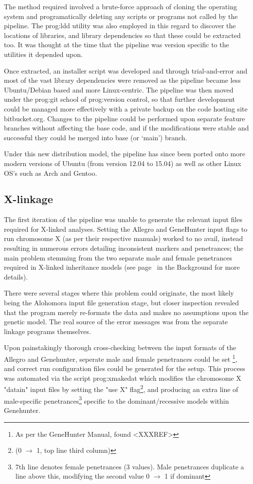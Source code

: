 The method required involved a brute-force approach of cloning the operating system and programatically deleting any scripts or programs not called by the pipeline. The \gls{prog:ldd} utility was also employed in this regard to discover the locations of libraries, and library dependencies so that these could be extracted too. It was thought at the time that the pipeline was version specific to the utilities it depended upon.

Once extracted, an installer script was developed and through trial-and-error and most of the vast library dependencies were removed as the pipeline became less Ubuntu/Debian based and more Linux-centric. The pipeline was then moved under the \gls{prog:git} school of \gls{prog:version control}, so that further development could be managed more effectively with a private backup on the code hosting site bitbucket.org. Changes to the pipeline could be performed upon separate feature branches without affecting the base code, and if the modifications were stable and successful they could be merged into base (or ‘main’) branch. 

Under this new distribution model, the pipeline has since been ported onto more modern versions of Ubuntu (from version 12.04 to 15.04) as well as other Linux OS's such as Arch and Gentoo.


\subsection{X-linkage}

The first iteration of the pipeline was unable to generate the relevant input files required for X-linked analyses. Setting the Allegro and GeneHunter input flags to run chromosome X (as per their respective manuals) worked to no avail, instead resulting in numerous errors detailing inconsistent markers and penetrances; the main problem stemming from the two separate male and female penetrances required in X-linked inheritance models (see page~\pageref{ref:back:xlinkrec} in the Background for more details).

There were several stages where this problem could originate, the most likely being the Alohomora input file generation stage, but closer inspection revealed that the program merely re-formats the data and makes no assumptions upon the genetic model. The real source of the error messages was from the separate linkage programs themselves.

Upon painstakingly thorough cross-checking between the input formats of the Allegro and Genehunter, seperate male and female penetrances could be set \footnote{As per the GeneHunter Manual, found <XXXREF>}, and correct run configuration files could be generated for the setup. This process was automated via the script \gls{prog:xmakedat} which modifies the chromosome X "datain" input files by setting the "use X" flag\footnote{(0 $\rightarrow$ 1, top line third column)}, and producing an extra line of male-specific penetrances\footnote{7th line denotes female penetrances (3 values). Male penetrances duplicate a line above this, modifying the second value 0 $\rightarrow$ 1 if dominant} specific to the dominant/recessive models within Genehunter.

